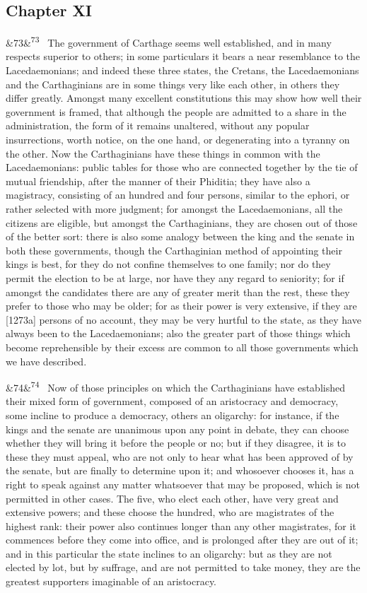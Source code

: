 \documentclass[12pt]{article}
\newcommand{\para}[1][]{\par\noindent\ifx&#1&\else\textsuperscript{\footnotesize #1}~\fi}
\begin{document}
\subsection*{Chapter XI}

\para[73] The government of Carthage seems well established, and in many respects superior to others; in some particulars it bears a near resemblance to the Lacedaemonians; and indeed these three states, the Cretans, the Lacedaemonians and the Carthaginians are in some things very like each other, in others they differ greatly. Amongst many excellent constitutions this may show how well their government is framed, that although the people are admitted to a share in the administration, the form of it remains unaltered, without any popular insurrections, worth notice, on the one hand, or degenerating into a tyranny on the other. Now the Carthaginians have these things in common with the Lacedaemonians: public tables for those who are connected together by the tie of mutual friendship, after the manner of their Phiditia; they have also a magistracy, consisting of an hundred and four persons, similar to the ephori, or rather selected with more judgment; for amongst the Lacedaemonians, all the citizens are eligible, but amongst the Carthaginians, they are chosen out of those of the better sort: there is also some analogy between the king and the senate in both these governments, though the Carthaginian method of appointing their kings is best, for they do not confine themselves to one family; nor do they permit the election to be at large, nor have they any regard to seniority; for if amongst the candidates there are any of greater merit than the rest, these they prefer to those who may be older; for as their power is very extensive, if they are [1273a] persons of no account, they may be very hurtful to the state, as they have always been to the Lacedaemonians; also the greater part of those things which become reprehensible by their excess are common to all those governments which we have described.

\para[74] Now of those principles on which the Carthaginians have established their mixed form of government, composed of an aristocracy and democracy, some incline to produce a democracy, others an oligarchy: for instance, if the kings and the senate are unanimous upon any point in debate, they can choose whether they will bring it before the people or no; but if they disagree, it is to these they must appeal, who are not only to hear what has been approved of by the senate, but are finally to determine upon it; and whosoever chooses it, has a right to speak against any matter whatsoever that may be proposed, which is not permitted in other cases. The five, who elect each other, have very great and extensive powers; and these choose the hundred, who are magistrates of the highest rank: their power also continues longer than any other magistrates, for it commences before they come into office, and is prolonged after they are out of it; and in this particular the state inclines to an oligarchy: but as they are not elected by lot, but by suffrage, and are not permitted to take money, they are the greatest supporters imaginable of an aristocracy.
\end{document}
